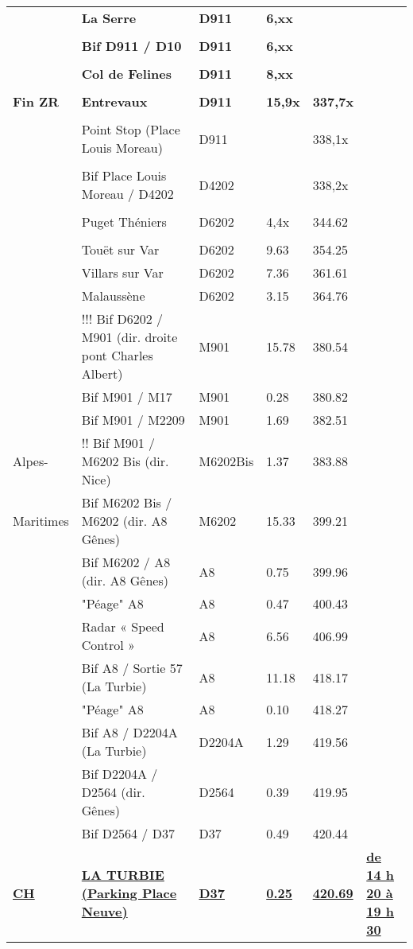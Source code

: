 \documentclass{article}%
\begin{document}
\begin{longtable}{p{2.25cm}|p{6.7cm}|p{2.0cm}|p{1.5cm}|p{1.5cm}|p{3.5cm}}
 &\textbf{La Serre}&\textbf{D911 }&\textbf{6,xx}& & \\%
 & & & & & \\%
 &\textbf{Bif D911 / D10 }&\textbf{D911 }&\textbf{6,xx}& & \\%
 & & & & & \\%
 &\textbf{Col de Felines}&\textbf{D911 }&\textbf{8,xx}& & \\%
 & & & & & \\%
\textbf{Fin ZR}&\textbf{Entrevaux}&\textbf{D911 }&\textbf{15,9x}&\textbf{337,7x}& \\%
 & & & & & \\%
 &Point Stop (Place Louis Moreau)&D911 & &338,1x& \\%
 & & & & & \\%
 &Bif Place Louis Moreau  / D4202 &D4202& &338,2x& \\%
 & & & & & \\%
 &Puget Théniers &D6202&4,4x&344.62& \\%
 & & & & & \\%
 &Touët sur Var&D6202&9.63&354.25& \\%
 &Villars sur Var&D6202&7.36&361.61& \\%
 &Malaussène&D6202&3.15&364.76& \\%
 &!!! Bif D6202 / M901  (dir. droite pont Charles Albert)&M901&15.78&380.54& \\%
 &Bif M901 / M17&M901 &0.28&380.82& \\%
 &Bif M901 / M2209 &M901&1.69&382.51& \\%
Alpes-&!! Bif M901 / M6202 Bis (dir. Nice)&M6202Bis&1.37&383.88& \\%
Maritimes&Bif M6202 Bis / M6202 (dir. A8 Gênes) &M6202 &15.33&399.21& \\%
 &Bif M6202 / A8 (dir. A8 Gênes) &A8&0.75&399.96& \\%
 &"Péage" A8&A8&0.47&400.43& \\%
 &Radar « Speed Control »&A8&6.56&406.99& \\%
 &Bif A8 / Sortie 57 (La Turbie)&A8&11.18&418.17& \\%
 &"Péage" A8&A8&0.10&418.27& \\%
 &Bif A8 / D2204A (La Turbie)&D2204A&1.29&419.56& \\%
 &Bif D2204A / D2564 (dir. Gênes)&D2564&0.39&419.95& \\%
 &Bif D2564 / D37&D37&0.49&420.44& \\%
\textbf{\underline{CH}}&\textbf{\underline{LA TURBIE (Parking Place Neuve) }}&\textbf{\underline{D37}}&\textbf{\underline{0.25}}&\textbf{\underline{420.69}}&\textbf{\underline{de 14 h 20 à 19 h 30}}\\%
\hline%
\end{longtable}%
\end{document}
